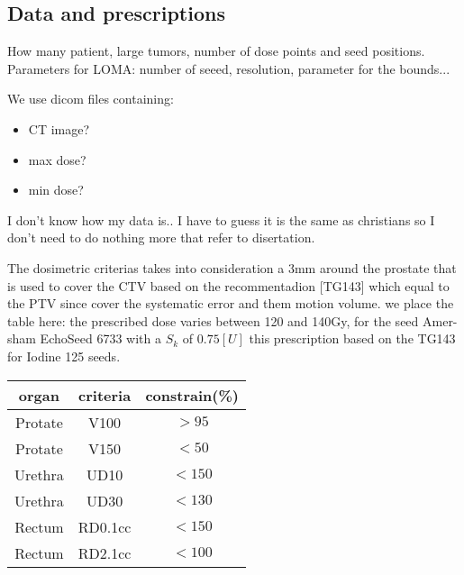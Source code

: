 \documentclass[12pt]{article}
\theoremstyle{definition}
\begin{document}
\subsection{Data and prescriptions}
How many patient, large tumors, number of dose points and seed positions. Parameters for LOMA: number of seeed, resolution, parameter for the bounds...\par
We use dicom files containing:
\begin{itemize}
    \item CT image?
    \item max dose?
    \item min dose?
\end{itemize}
I don't know how my data is.. I have to guess it is the same as christians so I don't need to do nothing more that refer to disertation.\par
The dosimetric criterias takes into consideration a 3mm around the prostate that is used to cover the CTV based on the recommentadion [TG143] which equal to the PTV since cover the systematic error and them motion volume. we place the table here: the prescribed dose varies between 120 and 140Gy, for the seed Amer- sham EchoSeed 6733 with a $S_k$ of $0.75 [U]$ this prescription based on the TG143 for Iodine 125 seeds.
\begin{center}
\begin{tabular}{ |c|c|c| } 
 \hline
 organ & criteria & constrain(\%)\\  \hline 
 Protate & V100  &  $>95$\\ 
 Protate & V150  &  $<50$\\ \hline
 Urethra & UD10 & $<150$ \\ 
 Urethra & UD30 & $<130$ \\ \hline
 Rectum & RD0.1cc & $<150$ \\ 
 Rectum & RD2.1cc & $<100$ \\ 
 \hline
\end{tabular}
\end{center}
\end{document}
